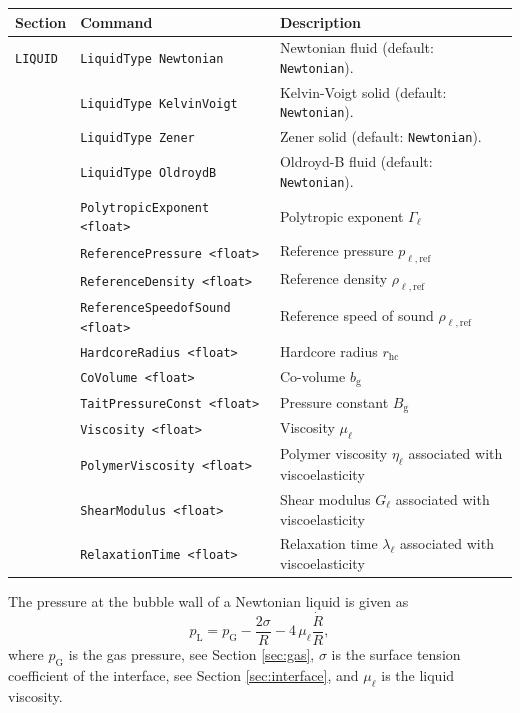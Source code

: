 \noindent
\begin{tabular}{p{} p{} p{}}
    \textbf{Section} &\textbf{Command} & \textbf{Description} 
\vspace{1mm} \\ \hline
{\tt LIQUID} & {\tt LiquidType Newtonian} & Newtonian fluid (default: {\tt Newtonian}).\\ 
& {\tt LiquidType KelvinVoigt} & Kelvin-Voigt solid (default: {\tt Newtonian}).\\ 
& {\tt LiquidType Zener} & Zener solid (default: {\tt Newtonian}).\\ 
& {\tt LiquidType OldroydB} & Oldroyd-B fluid (default: {\tt Newtonian}).\\ 
& {\tt PolytropicExponent <float>} & Polytropic exponent $\Gamma_{\ell}$\\
& {\tt ReferencePressure <float>} & Reference pressure $p_{\ell,\text{ref}}$\\
& {\tt ReferenceDensity <float>} & Reference density $\rho_{\ell,\text{ref}}$\\
& {\tt ReferenceSpeedofSound <float>} & Reference speed of sound $\rho_{\ell,\text{ref}}$\\
& {\tt HardcoreRadius <float>} & Hardcore radius $r_\text{hc}$\\
& {\tt CoVolume <float>} & Co-volume $b_\text{g}$\\
& {\tt TaitPressureConst <float>} & Pressure constant $B_\text{g}$\\
& {\tt Viscosity <float>} & Viscosity $\mu_\ell$ \\
& {\tt PolymerViscosity <float>} & Polymer viscosity $\eta_\ell$ associated with viscoelasticity \\
& {\tt ShearModulus <float>} & Shear modulus $G_\ell$ associated with viscoelasticity \\
& {\tt RelaxationTime <float>} & Relaxation time $\lambda_\ell$ associated with viscoelasticity \\
 \hline
\end{tabular} \vspace{1em}

The pressure at the bubble wall of a Newtonian liquid is given as
\begin{equation}
  p_\text{L} = p_\text{G} - \frac{2 \sigma}{R} - 4 \, \mu_\ell \frac{\dot{R}}{R},
\end{equation}
where $p_\text{G}$ is the gas pressure, see Section \ref{sec:gas}, $\sigma$ is the surface tension coefficient of the interface, see Section \ref{sec:interface}, and $\mu_\ell$ is the liquid viscosity.  

